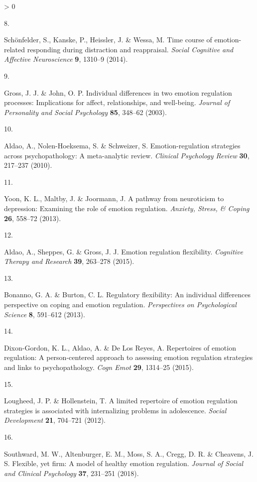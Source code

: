 \documentclass[
  english,
  man,floatsintext]{apa6}
\newlength{\cslhangindent}
\newlength{\csllabelwidth}
\newenvironment{CSLReferences}[2] %
 {%
  \setlength{\parindent}{0pt}
  \ifodd #1 \everypar{\setlength{\hangindent}{\cslhangindent}}\ignorespaces\fi
  \ifnum #2 > 0
  \setlength{\parskip}{#2\baselineskip}
  \fi
 }%
 {}
\newcommand{\CSLLeftMargin}[1]{\parbox[t]{\csllabelwidth}{#1}}
\newcommand{\CSLRightInline}[1]{\parbox[t]{\linewidth - \csllabelwidth}{#1}\break}
\begin{document}
\begin{CSLReferences}{0}{0}
\leavevmode\hypertarget{ref-Schoenfelder2014}{}%
\CSLLeftMargin{8. }
\CSLRightInline{Schönfelder, S., Kanske, P., Heissler, J. \& Wessa, M. Time course of emotion-related responding during distraction and reappraisal. \emph{Social Cognitive and Affective Neuroscience} \textbf{9}, 1310--9 (2014).}

\leavevmode\hypertarget{ref-GrossJohn2003}{}%
\CSLLeftMargin{9. }
\CSLRightInline{Gross, J. J. \& John, O. P. Individual differences in two emotion regulation processes: Implications for affect, relationships, and well-being. \emph{Journal of Personality and Social Psychology} \textbf{85}, 348--62 (2003).}

\leavevmode\hypertarget{ref-Aldao2010}{}%
\CSLLeftMargin{10. }
\CSLRightInline{Aldao, A., Nolen-Hoeksema, S. \& Schweizer, S. Emotion-regulation strategies across psychopathology: A meta-analytic review. \emph{Clinical Psychology Review} \textbf{30}, 217--237 (2010).}

\leavevmode\hypertarget{ref-Yoon2013}{}%
\CSLLeftMargin{11. }
\CSLRightInline{Yoon, K. L., Maltby, J. \& Joormann, J. A pathway from neuroticism to depression: Examining the role of emotion regulation. \emph{Anxiety, Stress, \& Coping} \textbf{26}, 558--72 (2013).}

\leavevmode\hypertarget{ref-Aldao2015}{}%
\CSLLeftMargin{12. }
\CSLRightInline{Aldao, A., Sheppes, G. \& Gross, J. J. Emotion regulation flexibility. \emph{Cognitive Therapy and Research} \textbf{39}, 263--278 (2015).}

\leavevmode\hypertarget{ref-Bonanno2013}{}%
\CSLLeftMargin{13. }
\CSLRightInline{Bonanno, G. A. \& Burton, C. L. Regulatory flexibility: An individual differences perspective on coping and emotion regulation. \emph{Perspectives on Psychological Science} \textbf{8}, 591--612 (2013).}

\leavevmode\hypertarget{ref-DixonGordon2015}{}%
\CSLLeftMargin{14. }
\CSLRightInline{Dixon-Gordon, K. L., Aldao, A. \& De Los Reyes, A. Repertoires of emotion regulation: A person-centered approach to assessing emotion regulation strategies and links to psychopathology. \emph{Cogn Emot} \textbf{29}, 1314--25 (2015).}

\leavevmode\hypertarget{ref-Lougheed2012}{}%
\CSLLeftMargin{15. }
\CSLRightInline{Lougheed, J. P. \& Hollenstein, T. A limited repertoire of emotion regulation strategies is associated with internalizing problems in adolescence. \emph{Social Development} \textbf{21}, 704--721 (2012).}

\leavevmode\hypertarget{ref-Southward2018}{}%
\CSLLeftMargin{16. }
\CSLRightInline{Southward, M. W., Altenburger, E. M., Moss, S. A., Cregg, D. R. \& Cheavens, J. S. Flexible, yet firm: A model of healthy emotion regulation. \emph{Journal of Social and Clinical Psychology} \textbf{37}, 231--251 (2018).}


\end{CSLReferences}
\end{document}
